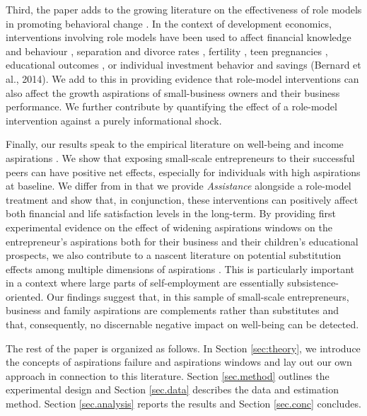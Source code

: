 \documentclass[11.5pt]{article}
\begin{document}
Third, the paper adds to the growing literature on the effectiveness of role models in promoting behavioral change \citep[see, e.g.,][]{Berg2017, Beaman2012, Ferrara2012, Chong2009, Kearney2015, Bernard2014, Riley2017}. %
In the context of development economics, interventions involving role models have been used to affect financial knowledge and behaviour \citep{Berg2017}, separation and divorce rates \citep{Chong2009}, fertility \citep{Ferrara2012}, teen pregnancies \citep{Kearney2015}, educational outcomes \citep{Beaman2012, Riley2017}, or individual investment behavior and savings (Bernard et al., 2014). We add to this in providing evidence that role-model interventions can also affect the growth aspirations of small-business owners and their business performance. We further contribute by quantifying the effect of a role-model intervention against a purely informational shock.

Finally, our results speak to the empirical literature on well-being and income aspirations \citep[e.g.,][]{Easterlin1995, Easterlin2001, Easterlin2003, Clark2008, Frey2002}. We show that exposing small-scale entrepreneurs to their successful peers can have positive net effects, especially for individuals with high aspirations at baseline. We differ from \citet{Bernard2014} in that we provide \emph{Assistance} alongside a role-model treatment and show that, in conjunction, these interventions can positively affect both financial and life satisfaction levels in the long-term. By providing first experimental evidence on the effect of widening aspirations windows on the entrepreneur's aspirations both for their business and their children's educational prospects, we also contribute to a nascent literature on potential substitution effects among multiple dimensions of aspirations \citep[see, e.g.,][]{Bernard2014, Bjorvatn2015}. This is particularly important in a context where large parts of self-employment are essentially subsistence-oriented. Our findings suggest that, in this sample of small-scale entrepreneurs, business and family aspirations are complements rather than substitutes and that, consequently, no discernable negative impact on well-being can be detected.

The rest of the paper is organized as follows. In Section \ref{sec:theory}, we introduce the concepts of aspirations failure and aspirations windows and lay out our own approach in connection to this literature. Section \ref{sec.method} outlines the experimental design and Section \ref{sec.data} describes the data and estimation method. Section \ref{sec.analysis} reports the results and Section \ref{sec.conc} concludes.
\end{document}
